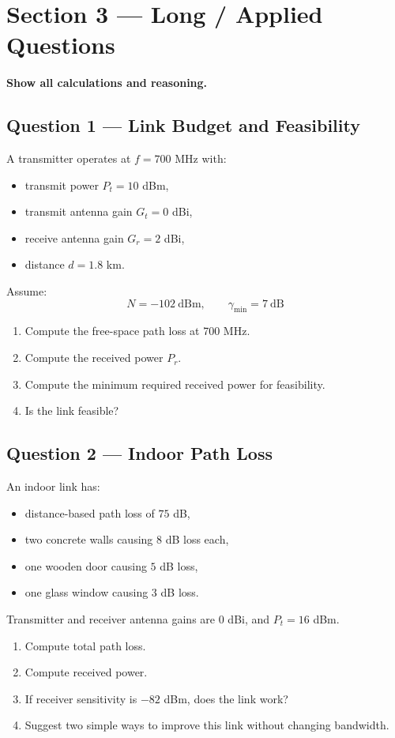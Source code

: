 \documentclass[11pt,a4paper]{article}
\begin{document}
\newpage
\section*{Section 3 --- Long / Applied Questions}
\textbf{Show all calculations and reasoning.}

\subsection*{Question 1 --- Link Budget and Feasibility}
A transmitter operates at $f = 700$ MHz with:
\begin{itemize}[leftmargin=1.2cm]
    \item transmit power $P_t = 10$ dBm,
    \item transmit antenna gain $G_t = 0$ dBi,
    \item receive antenna gain $G_r = 2$ dBi,
    \item distance $d = 1.8$ km.
\end{itemize}

Assume:
\[
N = -102\ \mathrm{dBm}, \qquad \gamma_{\min} = 7\ \mathrm{dB}
\]

\begin{enumerate}[label=\alph*)]
    \item Compute the free-space path loss at 700 MHz.
    \item Compute the received power $P_r$.
    \item Compute the minimum required received power for feasibility.
    \item Is the link feasible?
\end{enumerate}

\subsection*{Question 2 --- Indoor Path Loss}
An indoor link has:
\begin{itemize}[leftmargin=1.2cm]
    \item distance-based path loss of $75$ dB,
    \item two concrete walls causing $8$ dB loss each,
    \item one wooden door causing $5$ dB loss,
    \item one glass window causing $3$ dB loss.
\end{itemize}

Transmitter and receiver antenna gains are $0$ dBi, and $P_t = 16$ dBm.

\begin{enumerate}[label=\alph*)]
    \item Compute total path loss.
    \item Compute received power.
    \item If receiver sensitivity is $-82$ dBm, does the link work?
    \item Suggest two simple ways to improve this link without changing bandwidth.
\end{enumerate}
\end{document}
